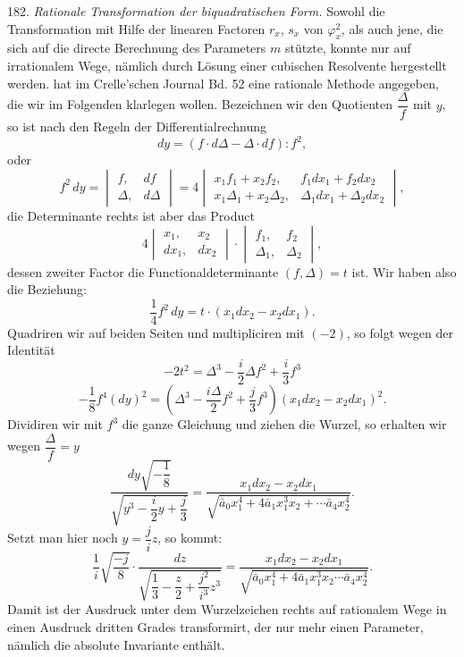 182. \textit{Rationale Transformation der biquadratischen Form.} Sowohl die Transformation mit Hilfe der linearen Factoren $r_x$, $s_x$ von $\varphi_x^2$, als auch jene, die sich auf die directe Berechnung des Parameters $m$ st\"utzte, konnte nur auf irrationalem Wege, n\"amlich durch L\"osung einer cubischen Resolvente hergestellt werden.  hat im Crelle'schen Journal Bd. 52 eine rationale Methode angegeben, die wir im Folgenden klarlegen wollen. Bezeichnen wir den Quotienten $\dfrac{\Delta}{f}$ mit $y$, so ist nach den Regeln der Differentialrechnung
\[
dy = (f\cdot d\Delta - \Delta\cdot df):f^2,
\]
oder
\[
f^2\,dy = \begin{vmatrix} f, & df\\ \Delta, & d\Delta \end{vmatrix} = 4\begin{vmatrix} x_1f_1+x_2f_2, & f_1dx_1+f_2dx_2\\ x_1\Delta_1+x_2\Delta_2, & \Delta_1dx_1+\Delta_2dx_2 \end{vmatrix},
\]
die Determinante rechts ist aber das Product
\[
4\begin{vmatrix} x_1, & x_2\\ dx_1, & dx_2 \end{vmatrix}\cdot\begin{vmatrix} f_1, & f_2\\ \Delta_1, & \Delta_2 \end{vmatrix},
\]
dessen zweiter Factor die Functionaldeterminante $(f,\Delta)=t$ ist. Wir haben also die Beziehung:
\[
\frac{1}{4}f^2\,dy = t\cdot(x_1dx_2-x_2dx_1).
\]
Quadriren wir auf beiden Seiten und multipliciren mit $(-2)$, so folgt wegen der Identit\"at
\[
-2t^2 = \Delta^3 - \frac{i}{2}\Delta f^2 + \frac{i}{3}f^3 %
\]
\[
-\frac{1}{8}f^4(dy)^2 = \left(\Delta^3-\frac{i\Delta}{2}f^2+\frac{j}{3}f^3\right)(x_1dx_2-x_2dx_1)^2.
\]
Dividiren wir mit $f^3$ die ganze Gleichung und ziehen die Wurzel, so erhalten wir wegen $\dfrac{\Delta}{f}=y$
\[
\frac{dy\sqrt{-\dfrac{1}{8}}}{\sqrt{y^3-\dfrac{i}{2}y+\dfrac{j}{3}}} = \frac{x_1dx_2-x_2dx_1}{\sqrt{\bar a_0 x_1^4+4\bar a_1 x_1^3x_2+\cdots \bar a_4 x_2^4}}.
\]
Setzt man hier noch $y=\dfrac{j}{i}z$, so kommt:
\[
\frac{1}{i}\sqrt{\frac{-j}{8}}\cdot\frac{dz}{\sqrt{\dfrac{1}{3}-\dfrac{z}{2}+\dfrac{j^2}{i^3}z^3}} = \frac{x_1dx_2-x_2dx_1}{\sqrt{\bar a_0 x_1^4+4\bar a_1 x_1^3x_2\cdots \bar a_4 x_2^4}}.
\]
Damit ist der Ausdruck unter dem Wurzelzeichen rechts auf rationalem Wege in einen Ausdruck dritten Grades transformirt, der nur mehr einen Parameter, n\"amlich die absolute Invariante enth\"alt.


